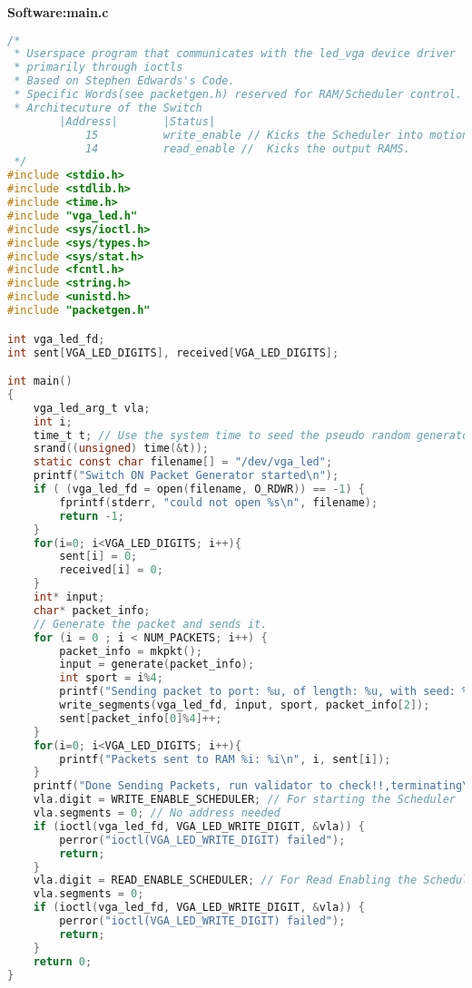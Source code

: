 \documentclass[twoside,12pt,fleqn]{book} %
\begin{document}
\newpage
\textbf{Software:main.c}
\begin{lstlisting}[language=C]
/*
 * Userspace program that communicates with the led_vga device driver
 * primarily through ioctls
 * Based on Stephen Edwards's Code.
 * Specific Words(see packetgen.h) reserved for RAM/Scheduler control.
 * Architecuture of the Switch
        |Address|       |Status|
            15          write_enable // Kicks the Scheduler into motion.
            14          read_enable //  Kicks the output RAMS.
 */
#include <stdio.h>
#include <stdlib.h>
#include <time.h>
#include "vga_led.h"
#include <sys/ioctl.h>
#include <sys/types.h>
#include <sys/stat.h>
#include <fcntl.h>
#include <string.h>
#include <unistd.h>
#include "packetgen.h"

int vga_led_fd;
int sent[VGA_LED_DIGITS], received[VGA_LED_DIGITS];

int main()
{
    vga_led_arg_t vla;
    int i;
    time_t t; // Use the system time to seed the pseudo random generator
    srand((unsigned) time(&t));
    static const char filename[] = "/dev/vga_led";
    printf("Switch ON Packet Generator started\n");
    if ( (vga_led_fd = open(filename, O_RDWR)) == -1) {
        fprintf(stderr, "could not open %s\n", filename);
        return -1;
    }
    for(i=0; i<VGA_LED_DIGITS; i++){
        sent[i] = 0;
        received[i] = 0;
    }
    int* input;
    char* packet_info;
    // Generate the packet and sends it.
    for (i = 0 ; i < NUM_PACKETS; i++) {
        packet_info = mkpkt();
        input = generate(packet_info);
        int sport = i%4;
        printf("Sending packet to port: %u, of length: %u, with seed: %u\n", packet_info[0], packet_info[2], packet_info[1]);
        write_segments(vga_led_fd, input, sport, packet_info[2]);
        sent[packet_info[0]%4]++;
    }
    for(i=0; i<VGA_LED_DIGITS; i++){
        printf("Packets sent to RAM %i: %i\n", i, sent[i]);
    }
    printf("Done Sending Packets, run validator to check!!,terminating\n");
    vla.digit = WRITE_ENABLE_SCHEDULER; // For starting the Scheduler
    vla.segments = 0; // No address needed
    if (ioctl(vga_led_fd, VGA_LED_WRITE_DIGIT, &vla)) {
        perror("ioctl(VGA_LED_WRITE_DIGIT) failed");
        return;
    }
    vla.digit = READ_ENABLE_SCHEDULER; // For Read Enabling the Scheduling
    vla.segments = 0;
    if (ioctl(vga_led_fd, VGA_LED_WRITE_DIGIT, &vla)) {
        perror("ioctl(VGA_LED_WRITE_DIGIT) failed");
        return;
    }
    return 0;
}

\end{lstlisting}
\newpage
\end{document}

